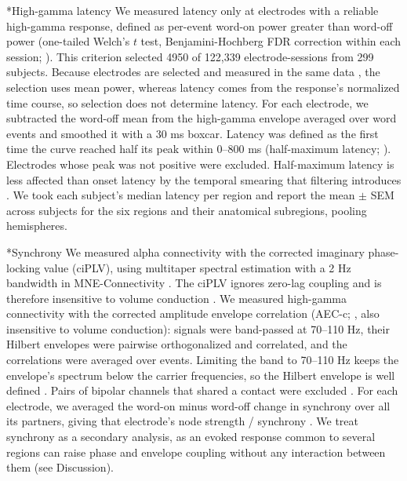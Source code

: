 \documentclass[10pt,twocolumn]{article}  %
\makeatletter
\renewcommand\subsection{\@startsection{subsection}{2}{\z@}{-8pt plus -2pt minus -1pt}{2pt}{\raggedright\sffamily\bfseries\normalsize}}
\makeatother
\begin{document}
\subsection*{High-gamma latency}\label{high-gamma-latency}
We measured latency only at electrodes with a reliable high-gamma response, defined as per-event word-on power greater than word-off power (one-tailed Welch's $t$ test, Benjamini-Hochberg FDR correction within each session; \citealp{WELCH_1947,Benjamini_1995}). This criterion selected 4950 of 122,339 electrode-sessions from 299 subjects. Because electrodes are selected and measured in the same data \citep{Kriegeskorte_2009}, the selection uses mean power, whereas latency comes from the response's normalized time course, so selection does not determine latency. For each electrode, we subtracted the word-off mean from the high-gamma envelope averaged over word events and smoothed it with a 30 ms boxcar. Latency was defined as the first time the curve reached half its peak within 0--800 ms (half-maximum latency; \citealp{Kiesel_2007,Liesefeld_2018}). Electrodes whose peak was not positive were excluded. Half-maximum latency is less affected than onset latency by the temporal smearing that filtering introduces \citep{VanRullen_2011}. We took each subject's median latency per region and report the mean $\pm$ SEM across subjects for the six regions and their anatomical subregions, pooling hemispheres.

\subsection*{Synchrony}\label{synchrony}
We measured alpha connectivity with the corrected imaginary phase-locking value (ciPLV), using multitaper spectral estimation with a 2 Hz bandwidth in MNE-Connectivity \citep{Gramfort_2013}. The ciPLV ignores zero-lag coupling and is therefore insensitive to volume conduction \citep{Nolte_2004,Bruna_2018}. We measured high-gamma connectivity with the corrected amplitude envelope correlation (AEC-c; \citealp{Hipp_2012}, also insensitive to volume conduction): signals were band-passed at 70--110 Hz, their Hilbert envelopes were pairwise orthogonalized and correlated, and the correlations were averaged over events. Limiting the band to 70--110 Hz keeps the envelope's spectrum below the carrier frequencies, so the Hilbert envelope is well defined \citep{Bedrosian_1963}. Pairs of bipolar channels that shared a contact were excluded \citep{Mercier_2017}. For each electrode, we averaged the word-on minus word-off change in synchrony over all its partners, giving that electrode's node strength / synchrony \citep{Rao_2025}. We treat synchrony as a secondary analysis, as an evoked response common to several regions can raise phase and envelope coupling without any interaction between them (see Discussion).
\end{document}
